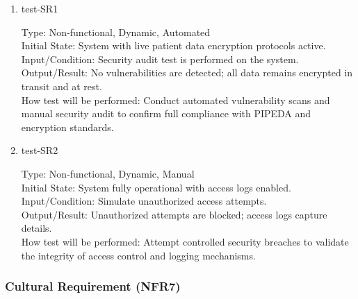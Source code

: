 \documentclass[12pt, titlepage]{article}
\begin{document}
\begin{enumerate}
    \item{test-SR1\\} \label{test-SR1}
    
    Type: Non-functional, Dynamic, Automated\\
    
    Initial State: System with live patient data encryption protocols active.\\
    
    Input/Condition: Security audit test is performed on the system.\\
    
    Output/Result: No vulnerabilities are detected; all data remains encrypted in transit and at rest.\\
    
    How test will be performed: Conduct automated vulnerability scans and manual security audit to confirm full compliance with PIPEDA and encryption standards.

    \item{test-SR2\\} \label{test-SR2}
    
    Type: Non-functional, Dynamic, Manual\\
    
    Initial State: System fully operational with access logs enabled.\\
    
    Input/Condition: Simulate unauthorized access attempts.\\
    
    Output/Result: Unauthorized attempts are blocked; access logs capture details.\\
    
    How test will be performed: Attempt controlled security breaches to validate the integrity of access control and logging mechanisms.
\end{enumerate}

\subsubsection{Cultural Requirement (NFR7)} \label{section:4.2.7}
\end{document}
